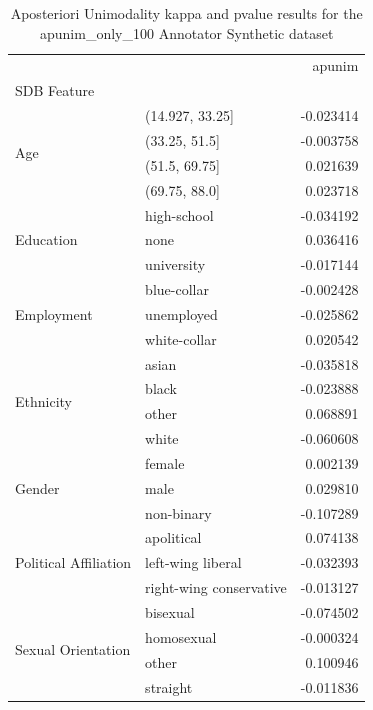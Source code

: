 \begin{table}
\caption{Aposteriori Unimodality kappa and pvalue results for the apunim_only_100 Annotator Synthetic dataset}
\label{tab:results_apunim_only_100}
\begin{tabular}{llr}
\toprule
 &  & apunim \\
SDB Feature &  &  \\
\midrule
\multirow[t]{4}{*}{Age} & (14.927, 33.25] & -0.023414 \\
 & (33.25, 51.5] & -0.003758 \\
 & (51.5, 69.75] & 0.021639 \\
 & (69.75, 88.0] & 0.023718 \\
\cline{1-3}
\multirow[t]{3}{*}{Education} & high-school & -0.034192 \\
 & none & 0.036416 \\
 & university & -0.017144 \\
\cline{1-3}
\multirow[t]{3}{*}{Employment} & blue-collar & -0.002428 \\
 & unemployed & -0.025862 \\
 & white-collar & 0.020542 \\
\cline{1-3}
\multirow[t]{4}{*}{Ethnicity} & asian & -0.035818 \\
 & black & -0.023888 \\
 & other & 0.068891 \\
 & white & -0.060608 \\
\cline{1-3}
\multirow[t]{3}{*}{Gender} & female & 0.002139 \\
 & male & 0.029810 \\
 & non-binary & -0.107289 \\
\cline{1-3}
\multirow[t]{3}{*}{Political Affiliation} & apolitical & 0.074138 \\
 & left-wing liberal & -0.032393 \\
 & right-wing conservative & -0.013127 \\
\cline{1-3}
\multirow[t]{4}{*}{Sexual Orientation} & bisexual & -0.074502 \\
 & homosexual & -0.000324 \\
 & other & 0.100946 \\
 & straight & -0.011836 \\
\cline{1-3}
\bottomrule
\end{tabular}
\end{table}
